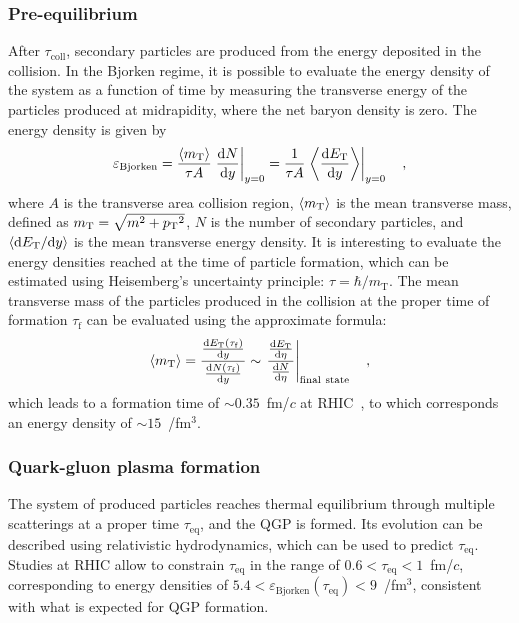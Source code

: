 \subsubsection{Pre-equilibrium}
After $\tau_\mathrm{coll}$, secondary particles are produced from the energy deposited in the collision. In the Bjorken regime, it is possible to evaluate the energy density of the system as a function of time by measuring the transverse energy of the particles produced at midrapidity, where the net baryon density is zero. The energy density is given by
\begin{equation*}
    \varepsilon_\mathrm{Bjorken} = \frac{\braket{m_\mathrm{T}}}{\tau A} \left. \frac{\mathrm{d} N}{\mathrm{d} y}\right\rvert_{y=0} = \frac{1}{\tau A}\left. \left\langle\frac{\mathrm{d} E_\mathrm{T}}{\mathrm{d} y}\right\rangle\right\rvert_{y=0} \quad ,
\end{equation*}
where $A$ is the transverse area collision region, $\braket{m_\mathrm{T}}$ is the mean transverse mass, defined as $m_\mathrm{T} = \sqrt{m^2 + p\mathrm{_T}^2}$, $N$ is the number of secondary particles, and $\braket{\mathrm{d} E_\mathrm{T}/\mathrm{d} y}$ is the mean transverse energy density. It is interesting to evaluate the energy densities reached at the time of particle formation, which can be estimated using Heisemberg's uncertainty principle: $\tau = \hbar/m_\mathrm{T}$. The mean transverse mass of the particles produced in the collision at the proper time of formation $\tau_\mathrm{f}$ can be evaluated using the approximate formula:
\begin{equation*}
    \braket{m_\mathrm{T}} = \frac{\frac{\mathrm{d} E_\mathrm{T}(\tau_\mathrm{f})}{\mathrm{d} y}}{\frac{\mathrm{d} N(\tau_\mathrm{f})}{\mathrm{d} y}}\sim \left. \frac{\frac{\mathrm{d} E_\mathrm{T}}{\mathrm{d} \eta}}{\frac{\mathrm{d} N}{\mathrm{d} \eta}}\right\rvert_\mathrm{final~state}\quad ,
\end{equation*}
which leads to a formation time of $\sim 0.35$~fm/$c$ at RHIC~\cite{PHENIX:2004vcz}, to which corresponds an energy density of $\sim 15$~\gev/fm$^3$.

\subsubsection{Quark-gluon plasma formation}
The system of produced particles reaches thermal equilibrium through multiple scatterings at a proper time $\tau_\mathrm{eq}$, and the QGP is formed. Its evolution can be described using relativistic hydrodynamics, which can be used to predict $\tau_\mathrm{eq}$. Studies at RHIC allow to constrain $\tau_\mathrm{eq}$ in the range of $0.6<\tau_\mathrm{eq}<1$~fm/$c$, corresponding to energy densities of $5.4 < \varepsilon_\mathrm{Bjorken}(\tau_\mathrm{eq})< 9$~\gev/fm$^3$, consistent with what is expected for QGP formation. 


